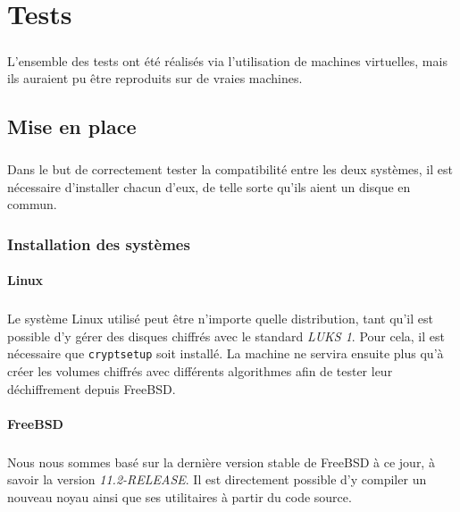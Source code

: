 \chapter{Tests}

\paragraph{}
L'ensemble des tests ont été réalisés via l'utilisation de machines virtuelles,
mais ils auraient pu être reproduits sur de vraies machines.

\section{Mise en place}

\paragraph{}
Dans le but de correctement tester la compatibilité entre les deux systèmes, il
est nécessaire d'installer chacun d'eux, de telle sorte qu'ils aient un disque
en commun.

\subsection{Installation des systèmes}
\subsubsection{Linux}
\paragraph{}
Le système Linux utilisé peut être n'importe quelle distribution, tant qu'il est
possible d'y gérer des disques chiffrés avec le standard \textit{LUKS 1}. Pour
cela, il est nécessaire que \texttt{cryptsetup} soit installé. La machine ne
servira ensuite plus qu'à créer les volumes chiffrés avec différents algorithmes
afin de tester leur déchiffrement depuis FreeBSD.
\subsubsection{FreeBSD}
\paragraph{}
Nous nous sommes basé sur la dernière version stable de FreeBSD à ce jour, à
savoir la version \textit{11.2-RELEASE}. Il est directement possible d'y
compiler un nouveau noyau ainsi que ses utilitaires à partir du code source.
